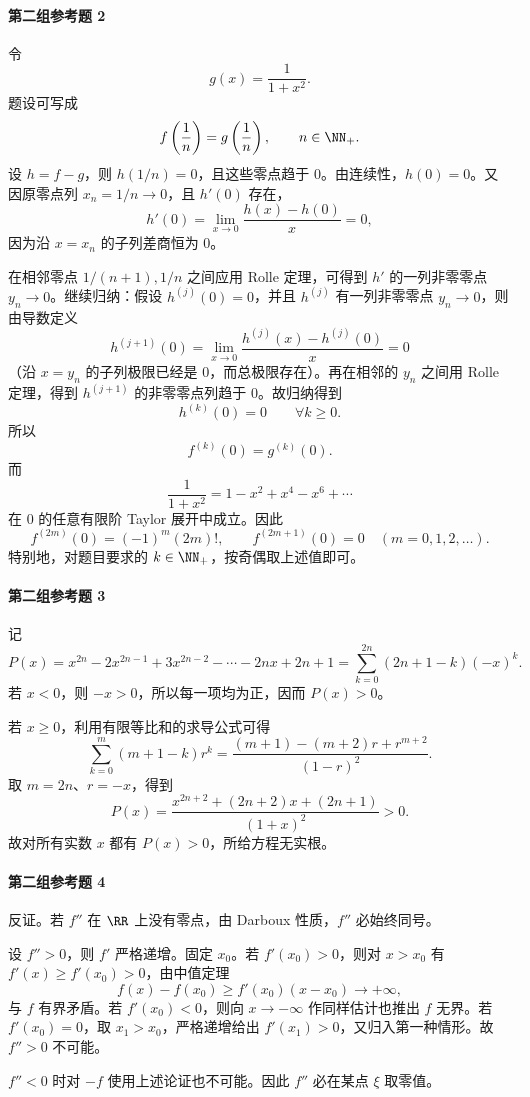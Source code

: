\paragraph{第二组参考题 2}
\begin{xsolution}
令
\[
  g(x)=\frac{1}{1+x^2}.
\]
题设可写成
\[
  f\left(\frac1n\right)=g\left(\frac1n\right),
  \qquad n\in\NN_+.
\]
设 $h=f-g$，则 $h(1/n)=0$，且这些零点趋于 $0$。由连续性，$h(0)=0$。又因原零点列 $x_n=1/n\to0$，且 $h'(0)$ 存在，
\[
  h'(0)=\lim_{x\to0}\frac{h(x)-h(0)}x=0,
\]
因为沿 $x=x_n$ 的子列差商恒为 $0$。

在相邻零点 $1/(n+1),1/n$ 之间应用 Rolle 定理，可得到 $h'$ 的一列非零零点 $y_n\to0$。继续归纳：假设 $h^{(j)}(0)=0$，并且 $h^{(j)}$ 有一列非零零点 $y_n\to0$，则由导数定义
\[
  h^{(j+1)}(0)
  =\lim_{x\to0}\frac{h^{(j)}(x)-h^{(j)}(0)}x=0
\]
（沿 $x=y_n$ 的子列极限已经是 $0$，而总极限存在）。再在相邻的 $y_n$ 之间用 Rolle 定理，得到 $h^{(j+1)}$ 的非零零点列趋于 $0$。故归纳得到
\[
  h^{(k)}(0)=0\qquad\forall k\geqslant0.
\]
所以
\[
  f^{(k)}(0)=g^{(k)}(0).
\]
而
\[
  \frac1{1+x^2}=1-x^2+x^4-x^6+\cdots
\]
在 $0$ 的任意有限阶 Taylor 展开中成立。因此
\[
  \boxed{
  f^{(2m)}(0)=(-1)^m(2m)!,\qquad
  f^{(2m+1)}(0)=0
  }
  \quad(m=0,1,2,\ldots).
\]
特别地，对题目要求的 $k\in\NN_+$，按奇偶取上述值即可。
\end{xsolution}

\paragraph{第二组参考题 3}
\begin{xsolution}
记
\[
  P(x)=x^{2n}-2x^{2n-1}+3x^{2n-2}-\cdots-2nx+2n+1
  =\sum_{k=0}^{2n}(2n+1-k)(-x)^k.
\]
若 $x<0$，则 $-x>0$，所以每一项均为正，因而 $P(x)>0$。

若 $x\geqslant0$，利用有限等比和的求导公式可得
\[
  \sum_{k=0}^{m}(m+1-k)r^k
  =\frac{(m+1)-(m+2)r+r^{m+2}}{(1-r)^2}.
\]
取 $m=2n$、$r=-x$，得到
\[
  P(x)=\frac{x^{2n+2}+(2n+2)x+(2n+1)}{(1+x)^2}>0.
\]
故对所有实数 $x$ 都有 $P(x)>0$，所给方程无实根。
\end{xsolution}

\paragraph{第二组参考题 4}
\begin{xsolution}
反证。若 $f''$ 在 $\RR$ 上没有零点，由 Darboux 性质，$f''$ 必始终同号。

设 $f''>0$，则 $f'$ 严格递增。固定 $x_0$。若 $f'(x_0)>0$，则对 $x>x_0$ 有 $f'(x)\geqslant f'(x_0)>0$，由中值定理
\[
  f(x)-f(x_0)\geqslant f'(x_0)(x-x_0)\to+\infty,
\]
与 $f$ 有界矛盾。若 $f'(x_0)<0$，则向 $x\to-\infty$ 作同样估计也推出 $f$ 无界。若 $f'(x_0)=0$，取 $x_1>x_0$，严格递增给出 $f'(x_1)>0$，又归入第一种情形。故 $f''>0$ 不可能。

$f''<0$ 时对 $-f$ 使用上述论证也不可能。因此 $f''$ 必在某点 $\xi$ 取零值。
\end{xsolution}

